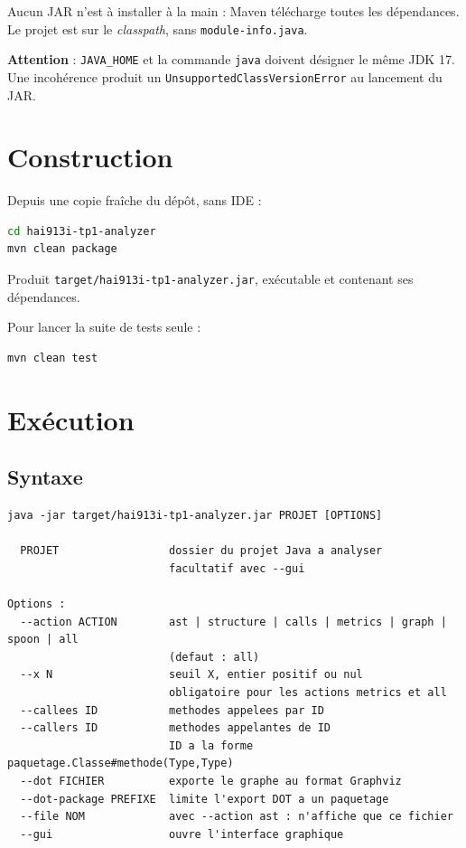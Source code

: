 \documentclass[11pt,a4paper]{article}
\begin{document}
Aucun JAR n'est à installer à la main : Maven télécharge toutes les dépendances. Le projet est sur le \textit{classpath}, sans \texttt{module-info.java}.

\textbf{Attention} : \texttt{JAVA\_HOME} et la commande \texttt{java} doivent désigner le même JDK 17. Une incohérence produit un \texttt{UnsupportedClassVersionError} au lancement du JAR.

\section{Construction}

Depuis une copie fraîche du dépôt, sans IDE :

\begin{lstlisting}[language=bash]
cd hai913i-tp1-analyzer
mvn clean package
\end{lstlisting}

Produit \texttt{target/hai913i-tp1-analyzer.jar}, exécutable et contenant ses dépendances.

Pour lancer la suite de tests seule :

\begin{lstlisting}[language=bash]
mvn clean test
\end{lstlisting}

\section{Exécution}

\subsection*{Syntaxe}

\begin{lstlisting}
java -jar target/hai913i-tp1-analyzer.jar PROJET [OPTIONS]

  PROJET                 dossier du projet Java a analyser
                         facultatif avec --gui

Options :
  --action ACTION        ast | structure | calls | metrics | graph | spoon | all
                         (defaut : all)
  --x N                  seuil X, entier positif ou nul
                         obligatoire pour les actions metrics et all
  --callees ID           methodes appelees par ID
  --callers ID           methodes appelantes de ID
                         ID a la forme paquetage.Classe#methode(Type,Type)
  --dot FICHIER          exporte le graphe au format Graphviz
  --dot-package PREFIXE  limite l'export DOT a un paquetage
  --file NOM             avec --action ast : n'affiche que ce fichier
  --gui                  ouvre l'interface graphique
\end{lstlisting}
\end{document}
